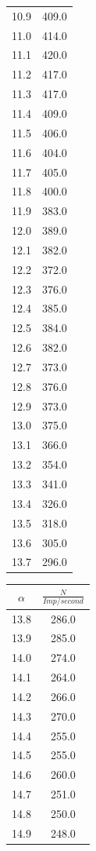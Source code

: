 \begin{table}
\begin{tabular}[t]{cc}
  \midrule
  10.9 & 409.0\\
  11.0 & 414.0\\
  11.1 & 420.0\\
  11.2 & 417.0\\
  11.3 & 417.0\\
  11.4 & 409.0\\
  11.5 & 406.0\\
  11.6 & 404.0\\
  11.7 & 405.0\\
  11.8 & 400.0\\
  11.9 & 383.0\\
  12.0 & 389.0\\
  12.1 & 382.0\\
  12.2 & 372.0\\
  12.3 & 376.0\\
  12.4 & 385.0\\
  12.5 & 384.0\\
  12.6 & 382.0\\
  12.7 & 373.0\\
  12.8 & 376.0\\
  12.9 & 373.0\\
  13.0 & 375.0\\
  13.1 & 366.0\\
  13.2 & 354.0\\
  13.3 & 341.0\\
  13.4 & 326.0\\
  13.5 & 318.0\\
  13.6 & 305.0\\
  13.7 & 296.0  \\
  \bottomrule
  \end{tabular}
  \begin{tabular}[t]{cc}
  \toprule
  $\alpha$ & $\frac{N}{Imp/\si{second}}$ \\
  \midrule
  13.8 & 286.0  \\
  13.9 & 285.0  \\
  14.0 & 274.0  \\
  14.1 & 264.0  \\
  14.2 & 266.0  \\
  14.3 & 270.0  \\
  14.4 & 255.0  \\
  14.5 & 255.0  \\
  14.6 & 260.0  \\
  14.7 & 251.0  \\
  14.8 & 250.0  \\
  14.9 & 248.0  \\

\end{tabular}
\end{table}

